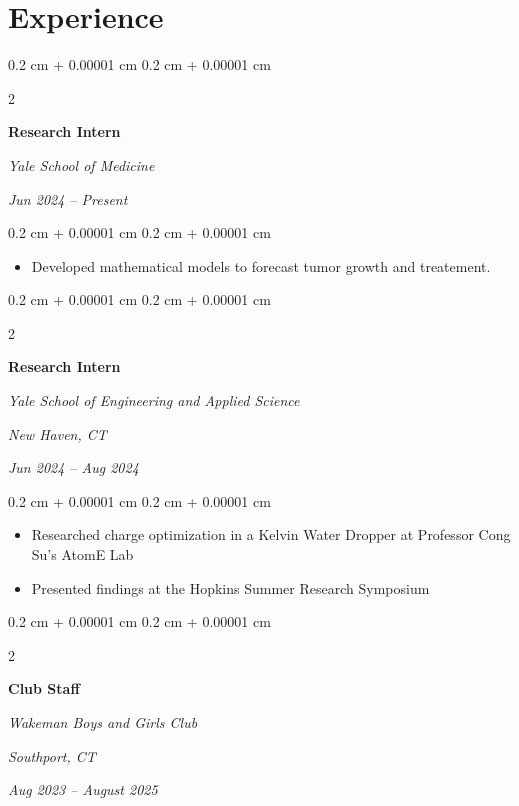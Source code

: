 \documentclass[10pt, letterpaper]{article}
\newenvironment{highlights}{
    \begin{itemize}[
        topsep=0.10 cm,
        parsep=0.10 cm,
        partopsep=0pt,
        itemsep=0pt,
        leftmargin=0.4 cm + 10pt
    ]
}{
    \end{itemize}
} %
\newenvironment{onecolentry}{
    \begin{adjustwidth}{
        0.2 cm + 0.00001 cm
    }{
        0.2 cm + 0.00001 cm
    }
}{
    \end{adjustwidth}
} %
\newenvironment{twocolentry}[2][]{
    \onecolentry
    \def\secondColumn{#2}
    \setcolumnwidth{\fill, 4.5 cm}
    \begin{paracol}{2}
}{
    \switchcolumn \raggedleft \secondColumn
    \end{paracol}
    \endonecolentry
} %
\begin{document}
    
    \section{Experience}

        \begin{twocolentry}{
            \textit{Jun 2024 – Present}}
            \textbf{Research Intern}
            
            \textit{Yale School of Medicine}
        \end{twocolentry}

        \vspace{0.10 cm}
        
        \begin{onecolentry}
            \begin{highlights}
                \item Developed mathematical models to forecast tumor growth and treatement.
            \end{highlights}
        \end{onecolentry}

        \vspace{0.2 cm}


         \begin{twocolentry}{
        \textit{New Haven, CT}    
            
        \textit{Jun 2024 – Aug 2024}}
            \textbf{Research Intern}
            
            \textit{Yale School of Engineering and Applied Science}
        \end{twocolentry}

        \vspace{0.10 cm}
        
        \begin{onecolentry}
            \begin{highlights}
                \item Researched charge optimization in a Kelvin Water Dropper at Professor Cong Su’s AtomE Lab
                \item Presented findings at the Hopkins Summer Research Symposium
            \end{highlights}
        \end{onecolentry}

        \vspace{0.2 cm}

         
        \begin{twocolentry}{
            \textit{Southport, CT}    
                
            \textit{Aug 2023 – August 2025}}
                \textbf{Club Staff}
                
                \textit{Wakeman Boys and Girls Club}
            \end{twocolentry}
    
\end{document}
